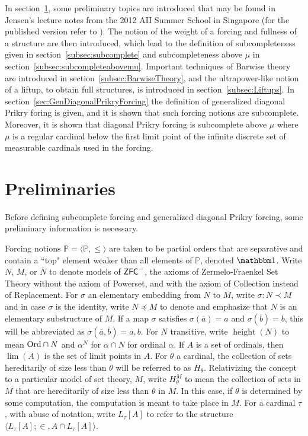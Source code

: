 \documentclass{amsart}
\theoremstyle{definition}
\theoremstyle{remark}
\renewcommand{\P}{\mathbb{P}}
\newcommand{\N}{{\overline{N}}}
\newcommand{\ZFC}{\textup{\ensuremath{\textsf{ZFC}}}}
\newcommand{\Ord}{\textup{\ensuremath{\text{Ord}}}}
\DeclareMathOperator{\height}{height}
\begin{document}
In section~\ref{sec:preliminaries}, some preliminary topics are introduced that may be found in Jensen's lecture notes from the 2012 AII Summer School in Singapore (for the published version refer to \cite{Jensen:2012fr}). The notion of the weight of a forcing and fullness of a structure are then introduced, which lead to the definition of subcompleteness given in section~\ref{subsec:subcomplete} and subcompleteness above $\mu$ in section~\ref{subsec:subcompleteabovemu}. Important techniques of Barwise theory are introduced in section~\ref{subsec:BarwiseTheory}, and the ultrapower-like notion of a liftup, to obtain full structures, is introduced in section~\ref{subsec:Liftups}. In section~\ref{sec:GenDiagonalPrikryForcing} the definition of generalized diagonal Prikry foring is given, and it is shown that such forcing notions are subcomplete. Moreover, it is shown that diagonal Prikry forcing is subcomplete above $\mu$ where $\mu$ is a regular cardinal below the first limit point of the infinite discrete set of measurable cardinals used in the forcing.

\section{Preliminaries} \label{sec:preliminaries}
Before defining subcomplete forcing and generalized diagonal Prikry forcing, some preliminary information is necessary.

Forcing notions $\P = \langle \P, \leq \rangle$ are taken to be partial orders that are separative and contain a ``top" element weaker than all elements of $\P$, denoted $\mathbbm 1$.
Write $N$, $M$, or $\N$ to denote models of $\ZFC^-$, the axioms of Zermelo-Fraenkel Set Theory without the axiom of \textsf{Powerset}, and with the axiom of \textsf{Collection} instead of \textsf{Replacement}. For $\sigma$ an elementary embedding from $N$ to $M$, write $\sigma: N \prec M$ and in case $\sigma$ is the identity, write $N \preccurlyeq M$ to denote and emphasize that $N$ is an elementary substructure of $M$. 
If a map $\sigma$ satisfies $\sigma(\overline a)=a$ and $\sigma(\overline b)=b$, this will be abbreviated as $\sigma(\overline a,\overline b)=a,b$.
For $N$ transitive, write $\height(N)$ to mean $\Ord \cap N$ and $\alpha^N$ for $\alpha \cap N$ for ordinal $\alpha$.
If $A$ is a set of ordinals, then $\lim(A)$ is the set of limit points in $A$.  
For $\theta$ a cardinal, the collection of sets hereditarily of size less than $\theta$ will be referred to as $H_\theta$. Relativizing the concept to a particular model of set theory, $M$, write $H_\theta^M$ to mean the collection of sets in $M$ that are hereditarily of size less than $\theta$ in $M$. In this case, if $\theta$ is determined by some computation, the computation is meant to take place in $M$.
For a cardinal $\tau$, with abuse of notation, write $L_\tau[A]$ to refer to the structure $\langle L_\tau[A]; \in, A \cap L_\tau[A] \rangle$. 
\end{document}
